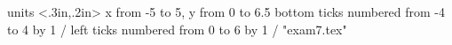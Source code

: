 %
%

\beginpicture
  \setcoordinatesystem units <.3in,.2in>
  \setplotarea x from -5 to 5, y from 0 to 6.5
  \axis bottom %
    ticks numbered from -4 to 4 by 1 /
 \axis left ticks numbered from 0 to 6 by 1 /
 \setquadratic
 \plot  "exam7.tex"
\endpicture
